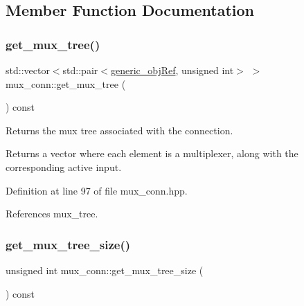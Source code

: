 \subsection{Member Function Documentation}
\mbox{\label{classmux__conn_a5fa62809bdf5a41b24ccc07825bacef4}} 
\subsubsection{\texorpdfstring{get\+\_\+mux\+\_\+tree()}{get\_mux\_tree()}}
{\footnotesize\ttfamily std\+::vector$<$std\+::pair$<$\hyperlink{generic__obj_8hpp_acb533b2ef8e0fe72e09a04d20904ca81}{generic\+\_\+obj\+Ref}, unsigned int$>$ $>$ mux\+\_\+conn\+::get\+\_\+mux\+\_\+tree (\begin{DoxyParamCaption}{ }\end{DoxyParamCaption}) const\hspace{0.3cm}{\ttfamily [inline]}}



Returns the mux tree associated with the connection. 

\begin{DoxyReturn}{Returns}
a vector where each element is a multiplexer, along with the corresponding active input. 
\end{DoxyReturn}


Definition at line 97 of file mux\+\_\+conn.\+hpp.



References mux\+\_\+tree.

\mbox{\label{classmux__conn_aa69d99d401fef74eb1b37cbadf9c9fcd}} 
\subsubsection{\texorpdfstring{get\+\_\+mux\+\_\+tree\+\_\+size()}{get\_mux\_tree\_size()}}
{\footnotesize\ttfamily unsigned int mux\+\_\+conn\+::get\+\_\+mux\+\_\+tree\+\_\+size (\begin{DoxyParamCaption}{ }\end{DoxyParamCaption}) const\hspace{0.3cm}{\ttfamily [inline]}}



